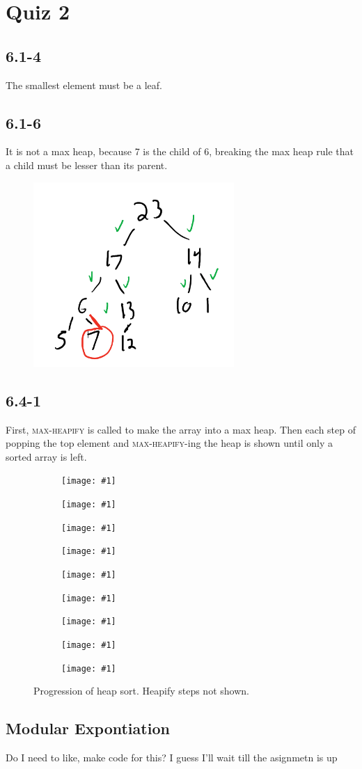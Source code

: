 \documentclass[12pt,letterpaper]{article}
\begin{document}
\section{Quiz 2}

\subsection{6.1-4}

The smallest element must be a leaf.

\subsection{6.1-6}

It is not a max heap, because 7 is the child of 6, breaking the max heap rule that a child must be
lesser than its parent.

\begin{figure}[h!]
    \centering
    \includegraphics[width=3in]{heap-drawing}
\end{figure}


\subsection{6.4-1}

First, \textsc{max-heapify} is called to make the array into a max heap. Then each step of popping
the top element and \textsc{max-heapify}-ing the heap is shown until only a sorted array is left.


\newcommand{\subfighelper}[1]{
     \begin{subfigure}[b]{0.3\textwidth}
         \centering \texttt{[image: \#1]}
         \caption{}
     \end{subfigure}
     \hfill
 }

\begin{figure}[h!]
     \centering
     \subfighelper{hs1}
     \subfighelper{hs2}
     \subfighelper{hs3}
     \par\bigskip
     \subfighelper{hs4}
     \subfighelper{hs5}
     \subfighelper{hs6}
     \par\bigskip
     \subfighelper{hs7}
     \subfighelper{hs8}
     \subfighelper{hs9}
        \caption{Progression of heap sort. Heapify steps not shown.}
\end{figure}


\subsection{Modular Expontiation}

Do I need to like, make code for this? I guess I'll wait till the asignmetn is up
\end{document}
